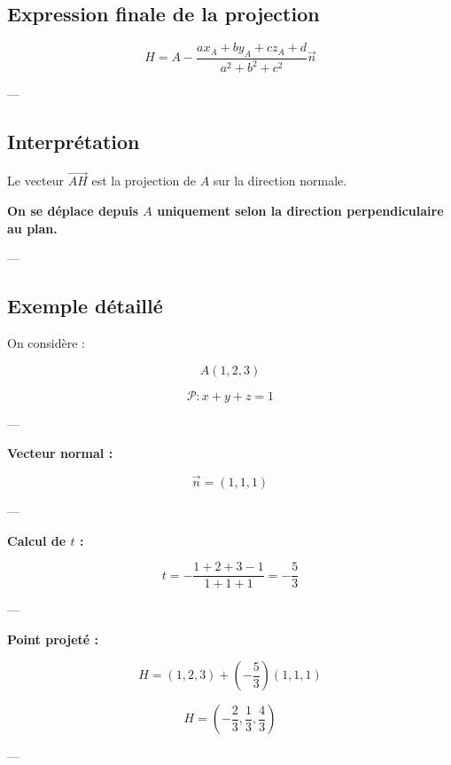 \documentclass[11pt,a4paper]{article}
\begin{document}
\subsection{Expression finale de la projection}

\[
\boxed{
H = A - \frac{ax_A + by_A + cz_A + d}{a^2 + b^2 + c^2} \vec{n}
}
\]

---

\subsection{Interprétation}

Le vecteur $\vec{AH}$ est la projection de $A$ sur la direction normale.

\bigskip

\begin{center}
\textbf{On se déplace depuis $A$ uniquement selon la direction perpendiculaire au plan.}
\end{center}

---

\subsection{Exemple détaillé}

On considère :

\[
A(1,2,3)
\]

\[
\mathcal{P} : x + y + z = 1
\]

---

\textbf{Vecteur normal :}

\[
\vec{n} = (1,1,1)
\]

---

\textbf{Calcul de $t$ :}

\[
t = -\frac{1+2+3-1}{1+1+1}
= -\frac{5}{3}
\]

---

\textbf{Point projeté :}

\[
H = (1,2,3) + \left(-\frac{5}{3}\right)(1,1,1)
\]

\[
\boxed{
H = \left(-\frac{2}{3}, \frac{1}{3}, \frac{4}{3}\right)
}
\]

---

\end{document}
